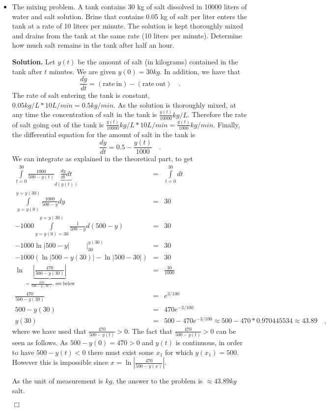 \documentclass[12pt]{book}
\newenvironment{solution}{\textbf{Solution.} }{$\Box$}
\begin{document}
\begin{itemize}
\begin{solution}
\end{solution}
\item The mixing problem. 
A tank contains 30 kg of salt dissolved in 10000 liters of water and salt solution. Brine that contains 0.05 kg of salt per liter enters the tank at a rate of 10 liters per minute. The solution is kept thoroughly mixed and drains from the tank at the same rate (10 liters per minute). Determine how much salt remains in the tank after half an hour.

\begin{solution}
Let $y(t)$ be the amount of salt (in kilograms) contained in the tank after $t$ minutes. We are given $y(0)= 30kg$. In addition, we have that 
\[
\frac{dy}{dt}= \mathrm{(rate~in)}-\mathrm{(rate~out)} \quad .
\]
The rate of salt entering the tank is constant, $0.05 kg/L *10 L/min= 0.5 kg/min$. As the solution is thoroughly mixed, at any time the concentration of salt in the tank is $\frac{y(t)}{10000} kg/L$. Therefore the rate of salt going out of the tank is $\frac{y(t)}{10000} kg/L * 10 L/min= \frac{y(t)}{1000} kg/min$. Finally, the differential equation for the amount of salt in the tank is
\[
\frac{dy}{dt}= 0.5-\frac{y(t)}{1000} \quad .
\]
We can integrate as explained in the theoretical part, to get 
\[
\begin{array}{rcl}
\int\limits_{t=0}^{30} \frac{1000}{500-y(t)}\underbrace{\frac{dy}{dt} dt}_{d(y(t))} &=& \int\limits_{t=0}^{30} dt \\
\int\limits_{y=y(0)}^{y=y(30)} \frac{1000}{500-y}dy&=& 30 \\
-1000\int\limits_{y=y(0)=30}^{y=y(30)} \frac{1}{500-y}d(500-y)&=& 30 \\
\left. -1000 \ln |500-y|~~~~~~~~~~~ \right|_{30}^{y(30)}&=& 30 \\
-1000 \left(\ln |500-y(30)| -\ln |500- 30|  \right)&=& 30 \\
\ln\underbrace{\left| \frac{470}{500-y(30)} \right|}_{=\frac{470}{500-y(30)}\mathrm{,~see~below} } &=& \frac{30}{1000} \\
\frac{470}{500-y(30)}&=&e^{3/100}\\
500-y(30)&=& 470e^{-3/100}\\
y(30)&=&500-470e^{-3/100}\approx 500-470*0.970445534\approx 43.89 \quad ,
\end{array}
\]
where we have used that $ \frac{470}{500-y(t)}>0 $. The fact that $ \frac{470}{500-y(t)}>0 $ can be seen as follows. As $500-y(0)=470>0$ and $y(t)$ is continuous, in order to have $500-y(t)<0$ there must exist some $x_1$ for which $y(x_1)=500$. However this is impossible since $x=\ln \left|\frac{470}{500-y(x)}\right|  $. 

As the unit of measurement is $kg$, the answer to the problem is $\approx 43.89 kg$ salt.

\end{solution}
\end{itemize}
\end{document}
